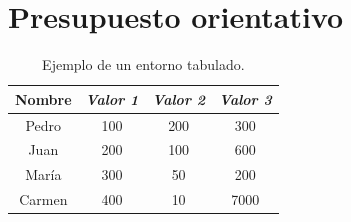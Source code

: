 \documentclass{DeustoFDP}
\begin{document}
\section{Presupuesto orientativo}
\begin{table}
  \centering
  \caption{Ejemplo de un entorno tabulado.}\label{tab:ejemplo}
  \begin{tabular}{cccc}
    \toprule
      \textbf{Nombre} & \emph{Valor 1} & \emph{Valor 2} & \emph{Valor 3}\\
    \midrule
      Pedro  & 100     & 200     & 300 \\
      Juan   & 200     & 100     & 600 \\
      Mar\'ia& 300     & 50      & 200 \\
      Carmen & 400     & 10      & 7000\\
    \bottomrule
  \end{tabular}
\end{table}

\printbibliography[heading=bibintoc]

\appendix

\backmatter
\end{document}
